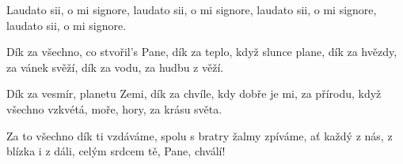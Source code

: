 
\beginchorus{}
Laudato sii, o mi signore,
laudato sii, o mi signore,
laudato sii, o mi signore,
laudato sii, o mi signore.
\endchorus{}

\beginverse{}
Dík za všechno, co stvořil's Pane,
dík za teplo, když slunce plane,
dík za hvězdy, za vánek svěží,
dík za vodu, za hudbu z věží.
\endverse{}

\beginchorus{}
\phantom{}
\endchorus{}

\beginverse{}
Dík za vesmír, planetu Zemi,
dík za chvíle, kdy dobře je mi,
za přírodu, když všechno vzkvétá,
moře, hory, za krásu světa.
\endverse{}

\beginchorus{}
\phantom{}
\endchorus{}

\beginverse{}
Za to všechno dík ti vzdáváme,
spolu s bratry žalmy zpíváme,
ať každý z nás, z blízka i z dáli,
celým srdcem tě, Pane, chválí!
\endverse{}

\beginchorus{}
\phantom{}
\endchorus{}

\endsong{}
